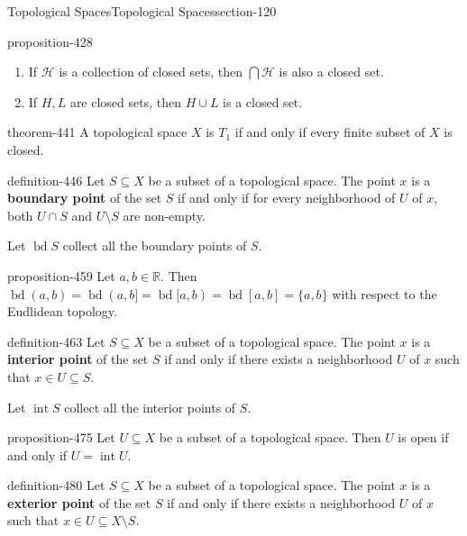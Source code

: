 \documentclass[oneside,10pt,]{article}
\newcommand{\terminology}[1]{\textbf{#1}}
\newcommand{\mb}{\mathbb}
\newcommand{\mc}{\mathcal}
\renewcommand{\int}{\operatorname{int}}
\newcommand{\bd}{\operatorname{bd}}
\begin{document}
\begin{sectionptx}{Topological Spaces}{}{Topological Spaces}{}{}{section-120}
\begin{proposition}{}{}{proposition-428}
\begin{enumerate}
\item\hypertarget{li-435}{}If \(\mc H\) is a collection of closed sets, then \(\bigcap\mc H\) is also a closed set.%
\item\hypertarget{li-438}{}If \(H,L\) are closed sets, then \(H\cup L\) is a closed set.%
\end{enumerate}
\end{proposition}
\begin{theorem}{}{}{theorem-441}%
\hypertarget{p-442}{}%
A topological space \(X\) is \(T_1\) if and only if every finite subset of \(X\) is closed.%
\end{theorem}
\begin{definition}{}{definition-446}%
\hypertarget{p-447}{}%
Let \(S\subseteq X\) be a subset of a topological space. The point \(x\) is a \terminology{boundary point} of the set \(S\) if and only if for every neighborhood of \(U\) of \(x\), both \(U\cap S\) and \(U\setminus S\) are non-empty.%
\par
\hypertarget{p-456}{}%
Let \(\bd S\) collect all the boundary points of \(S\).%
\end{definition}
\begin{proposition}{}{}{proposition-459}%
\hypertarget{p-460}{}%
Let \(a,b\in\mb R\). Then \(\bd (a,b)=\bd (a,b]=\bd [a,b)=\bd [a,b]=\{a,b\}\) with respect to the Eudlidean topology.%
\end{proposition}
\begin{definition}{}{definition-463}%
\hypertarget{p-464}{}%
Let \(S\subseteq X\) be a subset of a topological space. The point \(x\) is a \terminology{interior point} of the set \(S\) if and only if there exists a neighborhood \(U\) of \(x\) such that \(x\in U\subseteq S\).%
\par
\hypertarget{p-472}{}%
Let \(\int S\) collect all the interior points of \(S\).%
\end{definition}
\begin{proposition}{}{}{proposition-475}%
\hypertarget{p-476}{}%
Let \(U\subseteq X\) be a subset of a topological space. Then \(U\) is open if and only if \(U=\int U\).%
\end{proposition}
\begin{definition}{}{definition-480}%
\hypertarget{p-481}{}%
Let \(S\subseteq X\) be a subset of a topological space. The point \(x\) is a \terminology{exterior point} of the set \(S\) if and only if there exists a neighborhood \(U\) of \(x\) such that \(x\in U\subseteq X\setminus S\).%
\par
\hypertarget{p-489}{}%

\end{definition}
\end{sectionptx}
\end{document}
